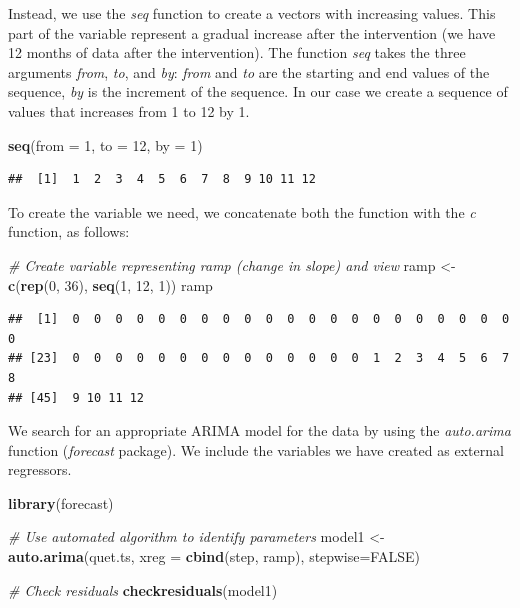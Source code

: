 \documentclass[
]{article}
\newenvironment{Shaded}{\begin{snugshade}}{\end{snugshade}}
\newcommand{\CommentTok}[1]{\textcolor[rgb]{0.56,0.35,0.01}{\textit{#1}}}
\newcommand{\DataTypeTok}[1]{\textcolor[rgb]{0.13,0.29,0.53}{#1}}
\newcommand{\DecValTok}[1]{\textcolor[rgb]{0.00,0.00,0.81}{#1}}
\newcommand{\KeywordTok}[1]{\textcolor[rgb]{0.13,0.29,0.53}{\textbf{#1}}}
\newcommand{\NormalTok}[1]{#1}
\newcommand{\OtherTok}[1]{\textcolor[rgb]{0.56,0.35,0.01}{#1}}
\newcommand{\StringTok}[1]{\textcolor[rgb]{0.31,0.60,0.02}{#1}}
\begin{document}
Instead, we use the \emph{seq} function to create a vectors with increasing values. This part of the variable represent a gradual increase after the intervention (we have 12 months of data after the intervention). The function \emph{seq} takes the three arguments \emph{from}, \emph{to}, and \emph{by}: \emph{from} and \emph{to} are the starting and end values of the sequence, \emph{by} is the increment of the sequence. In our case we create a sequence of values that increases from 1 to 12 by 1.

\begin{Shaded}
\begin{Highlighting}[]
\KeywordTok{seq}\NormalTok{(}\DataTypeTok{from =} \DecValTok{1}\NormalTok{, }\DataTypeTok{to =} \DecValTok{12}\NormalTok{, }\DataTypeTok{by =} \DecValTok{1}\NormalTok{)}
\end{Highlighting}
\end{Shaded}

\begin{verbatim}
##  [1]  1  2  3  4  5  6  7  8  9 10 11 12
\end{verbatim}

To create the variable we need, we concatenate both the function with the \emph{c} function, as follows:

\begin{Shaded}
\begin{Highlighting}[]
\CommentTok{# Create variable representing ramp (change in slope) and view}
\NormalTok{ramp <-}\StringTok{ }\KeywordTok{c}\NormalTok{(}\KeywordTok{rep}\NormalTok{(}\DecValTok{0}\NormalTok{, }\DecValTok{36}\NormalTok{), }\KeywordTok{seq}\NormalTok{(}\DecValTok{1}\NormalTok{, }\DecValTok{12}\NormalTok{, }\DecValTok{1}\NormalTok{))}
\NormalTok{ramp }
\end{Highlighting}
\end{Shaded}

\begin{verbatim}
##  [1]  0  0  0  0  0  0  0  0  0  0  0  0  0  0  0  0  0  0  0  0  0  0
## [23]  0  0  0  0  0  0  0  0  0  0  0  0  0  0  1  2  3  4  5  6  7  8
## [45]  9 10 11 12
\end{verbatim}

We search for an appropriate ARIMA model for the data by using the \emph{auto.arima} function (\emph{forecast} package). We include the variables we have created as external regressors.

\begin{Shaded}
\begin{Highlighting}[]
\KeywordTok{library}\NormalTok{(forecast)}

\CommentTok{# Use automated algorithm to identify parameters}
\NormalTok{model1 <-}\StringTok{ }\KeywordTok{auto.arima}\NormalTok{(quet.ts, }\DataTypeTok{xreg =} \KeywordTok{cbind}\NormalTok{(step, ramp), }\DataTypeTok{stepwise=}\OtherTok{FALSE}\NormalTok{)}

\CommentTok{# Check residuals}
\KeywordTok{checkresiduals}\NormalTok{(model1)}
\end{Highlighting}
\end{Shaded}
\end{document}
